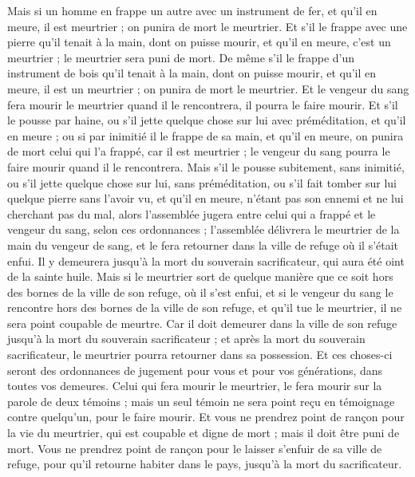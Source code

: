 \begin{multicols}{2}
Mais si un homme en frappe un autre avec un instrument de fer, et qu'il en meure, il est meurtrier ; on punira de mort le meurtrier.
Et s'il le frappe avec une pierre qu'il tenait à la main, dont on puisse mourir, et qu’il en meure, c'est un meurtrier ; le meurtrier sera puni de mort.
De même s'il le frappe d'un instrument de bois qu'il tenait à la main, dont on puisse mourir, et qu’il en meure, il est un meurtrier ;  on punira de mort le meurtrier.
Et le vengeur du sang fera mourir le meurtrier quand il le rencontrera, il pourra le faire mourir.
Et s’il le pousse par haine, ou s'il jette quelque chose sur lui avec préméditation, et qu’il en meure ;
ou si par inimitié il le frappe de sa main, et qu’il en meure, on punira de mort celui qui l'a frappé, car il est meurtrier ; le vengeur du sang pourra le faire mourir quand il le rencontrera.
Mais s'il le pousse subitement, sans inimitié, ou s'il jette quelque chose  sur lui, sans préméditation,
ou s'il fait tomber sur lui quelque pierre sans l’avoir vu, et qu’il en meure, n’étant pas son ennemi et ne lui cherchant pas du mal,
alors l'assemblée jugera entre celui qui a frappé et le vengeur du sang, selon ces ordonnances ;
l'assemblée délivrera le meurtrier de la main du vengeur de sang, et le fera retourner dans la ville de refuge où il s'était enfui. Il y demeurera jusqu'à la mort du souverain sacrificateur, qui aura été oint de la sainte huile.
Mais si le meurtrier sort de quelque manière que ce soit hors des bornes de la ville de son refuge, où il s'est enfui,
et si le vengeur du sang le rencontre hors des bornes de la ville de son refuge, et qu'il tue le meurtrier, il ne sera point coupable de meurtre.
Car il doit demeurer dans la ville de son refuge jusqu’à la mort du souverain sacrificateur ; et après la mort du souverain sacrificateur, le meurtrier pourra retourner dans sa possession.
Et ces choses-ci seront des ordonnances de jugement pour vous et pour vos générations, dans toutes vos demeures.
Celui qui fera mourir le meurtrier, le fera mourir sur la parole de deux témoins ; mais un seul témoin ne sera point reçu en témoignage contre quelqu'un, pour le faire mourir.
Et vous ne prendrez point de rançon pour la vie du meurtrier, qui est coupable et digne de mort ; mais il doit être puni de mort.
Vous ne prendrez point de rançon pour le laisser s'enfuir de sa ville de refuge, pour qu’il retourne habiter dans le pays, jusqu'à la mort du sacrificateur.

\end{multicols}
